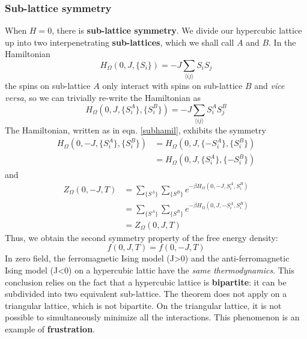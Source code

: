\documentclass[12pt,titlepage]{article}
\numberwithin{equation}{section}
\begin{document}
\subsubsection{Sub-lattice symmetry}
When $H=0$, there is \textbf{sub-lattice symmetry}. We divide our hypercubic lattice up into two interpenetrating \textbf{sub-lattices}, which we shall call $A$ and $B$. In the Hamiltonian
\begin{equation}
    H_{\Omega}(0, J,\{S_i\})=-J\sum_{\langle ij \rangle}S_iS_j
\end{equation}
the spins on sub-lattice $A$ only interact with spins on sub-lattice $B$ and \emph{vice versa}, so we can trivially re-write the Hamiltonian as
\begin{equation}
\label{subhamil}
    H_{\Omega}(0, J,\{S^A_i\},\{S^B_i\})=-J\sum_{\langle ij\rangle}S^A_iS^B_j
\end{equation}
The Hamiltonian, written as in eqn. \ref{subhamil}, exhibits the symmetry
\begin{equation}
\begin{split}
    H_{\Omega}(0, -J,\{S^A_i\},\{S^B_i\})&=H_{\Omega}(0, J,\{-S^A_i\},\{S^B_i\})\\
    &=H_{\Omega}(0, J,\{S^A_i\},\{-S^B_i\})
\end{split}
\end{equation}
and
\begin{equation}
\begin{split}
    Z_{\Omega}(0,-J,T)&=\sum_{\{S^A\}}\sum_{\{S^B\}} e^{-\beta H_{\Omega}(0,-J, S_i^A,S_i^B)}\\
    &=\sum_{\{S^A\}}\sum_{\{S^B\}} e^{-\beta H_{\Omega}(0,J, -S_i^A,S_i^B)}\\
    &=Z_{\Omega}(0,J,T)
\end{split}
\end{equation}
Thus, we obtain the second symmetry property of the free energy density:
\begin{equation}
    f(0, J, T)=f(0,-J,T)
\end{equation}
In zero field, the ferromagnetic Ising model (J>0) and the anti-ferromagnetic Ising model (J<0) on a hypercubic lattic have the \emph{same thermodynamics}. This conclusion relies on the fact that a hypercubic lattice is \textbf{bipartite}: it can be subdivided into two equivalent sub-lattice. The theorem does not apply on a triangular lattice, which is not bipartite. On the triangular lattice, it is not possible to simultaneously minimize all the interactions. This phenomenon is an example of \textbf{frustration}.
\end{document}
